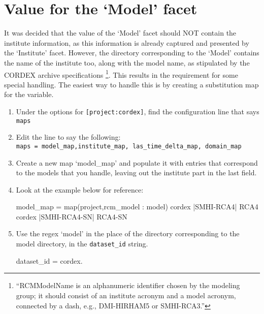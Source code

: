 \section{Value for the `Model' facet}
It was decided that the value of the `Model' facet should NOT contain the institute information, as this information is already captured and presented by the `Institute' facet.  However, the directory corresponding to the `Model' contains the name of the institute too, along with the model name, as stipulated by the CORDEX archive specifications \footnote{``RCMModelName is an alphanumeric identifier chosen by the modeling group; it should consist of an institute acronym and a model acronym, connected by a dash, e.g., DMI-HIRHAM5 or SMHI-RCA3.''\cite{cordexarchivespecs}}. This results in the requirement for some special handling.
\mypar
The easiest way to handle this is by creating a substitution map for the variable.
\begin{enumerate}
\item Under the options for \texttt{[project:cordex]}, find the configuration line that says \texttt{maps}
\item Edit the line to say the following:\\
\texttt{maps = model\_map,institute\_map, las\_time\_delta\_map, domain\_map}
\item Create a new map `model\_map' and populate it with entries that correspond to  the models that you handle, leaving out the institute part in the last field.
\item Look at the example below for reference:
\begin{verbatimtab}[4]
model_map = map(project,rcm_model : model)
    cordex |SMHI-RCA4| RCA4
    cordex |SMHI-RCA4-SN| RCA4-SN
\end{verbatimtab}
\item Use the regex `model' in the place of the directory corresponding to the model directory, in the \texttt{dataset\_id} string.
\vspace{-6mm}\\
\begin{verbatimtab}[4]
dataset_id = cordex.%
\end{verbatimtab}
\end{enumerate}
